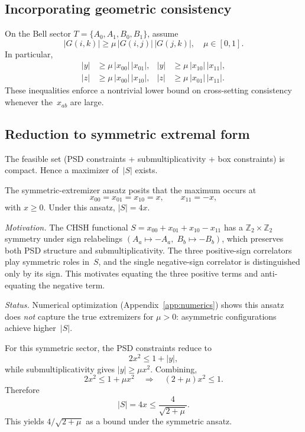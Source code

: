 \documentclass[11pt,a4paper]{article}
\theoremstyle{definition}
\theoremstyle{remark}
\begin{document}
\subsection{Incorporating geometric consistency}

On the Bell sector $T = \{A_0,A_1,B_0,B_1\}$, assume
\[
|G(i,k)| \ge \mu\,|G(i,j)|\,|G(j,k)|, \quad \mu \in [0,1].
\]
In particular,
\begin{align}
|y| &\ge \mu\,|x_{00}|\,|x_{01}|, & |y| &\ge \mu\,|x_{10}|\,|x_{11}|, \label{eq:sub-y}\\
|z| &\ge \mu\,|x_{00}|\,|x_{10}|, & |z| &\ge \mu\,|x_{01}|\,|x_{11}|. \label{eq:sub-z}
\end{align}
These inequalities enforce a nontrivial lower bound on cross-setting consistency whenever the~$x_{ab}$ are large.

\subsection{Reduction to symmetric extremal form}

The feasible set (PSD constraints + submultiplicativity + box constraints) is compact. Hence a maximizer of~$|S|$ exists.

The symmetric-extremizer ansatz posits that the maximum occurs at
\[
x_{00} = x_{01} = x_{10} = x, \qquad x_{11} = -x,
\]
with $x \ge 0$. Under this ansatz, $|S| = 4x$.

\emph{Motivation.} The CHSH functional $S = x_{00}+x_{01}+x_{10}-x_{11}$ has a $\mathbb{Z}_2 \times \mathbb{Z}_2$ symmetry under sign relabelings $(A_a \mapsto -A_a,\; B_b \mapsto -B_b)$, which preserves both PSD structure and submultiplicativity. The three positive-sign correlators play symmetric roles in~$S$, and the single negative-sign correlator is distinguished only by its sign. This motivates equating the three positive terms and anti-equating the negative term.

\emph{Status.} Numerical optimization (Appendix~\ref{app:numerics}) shows this ansatz does \emph{not} capture the true extremizers for $\mu > 0$: asymmetric configurations achieve higher~$|S|$.

For this symmetric sector, the PSD constraints reduce to
\[
2x^2 \le 1 + |y|,
\]
while submultiplicativity gives $|y| \ge \mu x^2$. Combining,
\[
2x^2 \le 1 + \mu x^2 \quad\Longrightarrow\quad (2+\mu)x^2 \le 1.
\]
Therefore
\[
|S| = 4x \le \frac{4}{\sqrt{2+\mu}}.
\]
This yields $4/\sqrt{2+\mu}$ as a bound under the symmetric ansatz.
\end{document}
